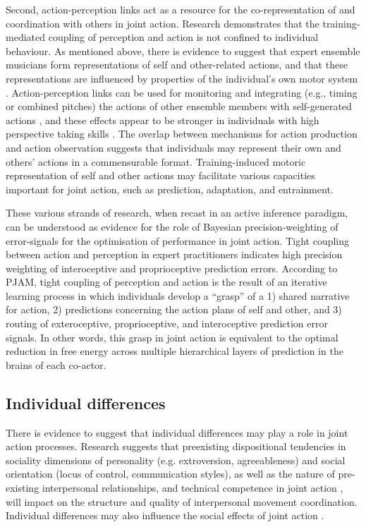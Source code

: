\begin{CJK}{UTF8}{gbsn}
Second, action-perception links act as a resource for the co-representation of and coordination with others in joint action.
Research demonstrates that the training-mediated coupling of perception and action is not confined to individual behaviour.  As mentioned above, there is evidence to suggest that expert ensemble musicians form representations of self and other-related actions, and that these representations are influenced by properties of the individual’s own motor system \citep{Novembre2012}.  Action-perception links can be used for monitoring and integrating (e.g., timing or combined pitches) the actions of other ensemble members with self-generated actions \citep{Loehr2013}, and these effects appear to be stronger in individuals with high perspective taking skills \citep{Novembre2012,Loehr2013}.  The overlap between mechanisms for action production and action observation suggests that individuals may represent their own and others’ actions in a commensurable format.  Training-induced motoric representation of self and other actions may facilitate various capacities important for joint action, such as prediction, adaptation, and entrainment.

These various strands of research, when recast in an active inference paradigm, can be understood as evidence for the role of Bayesian precision-weighting of error-signals for the optimisation of performance in joint action.  Tight coupling between action and perception in expert practitioners indicates high precision weighting of interoceptive and proprioceptive prediction errors.   According to PJAM, tight coupling of perception and action is the result of an iterative learning process in which individuals develop a ``grasp'' of a 1) shared narrative for action, 2) predictions concerning the action plans of self and other, and 3) routing of exteroceptive, proprioceptive, and interoceptive prediction error signals.  In other words, this grasp in joint action is equivalent to the optimal reduction in free energy across multiple hierarchical layers of prediction in the brains of each co-actor.





\subsection{Individual differences}

There is evidence to suggest that individual differences may play a role in joint action processes.  Research suggests that preexisting dispositional tendencies in sociality dimensions of personality (e.g. extroversion, agreeableness) and social orientation (locus of control, communication styles), as well as the nature of pre-existing interpersonal relationships, and technical competence in joint action \citep{Novembre2014}, will impact on the structure and quality of interpersonal movement coordination.  Individual differences may also influence the social effects of joint action \citep{Marsh2009}.


\end{CJK}
